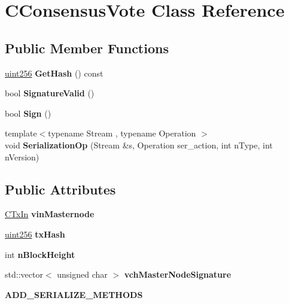 \hypertarget{class_c_consensus_vote}{}\section{C\+Consensus\+Vote Class Reference}
\label{class_c_consensus_vote}
\subsection*{Public Member Functions}
\begin{DoxyCompactItemize}
\item 
\mbox{\label{class_c_consensus_vote_a1bf097f2b12e5a77969bc489a6508399}} 
\mbox{\hyperlink{classuint256}{uint256}} {\bfseries Get\+Hash} () const
\item 
\mbox{\label{class_c_consensus_vote_ac6550a89acee255e0035e189a42a6310}} 
bool {\bfseries Signature\+Valid} ()
\item 
\mbox{\label{class_c_consensus_vote_a687495887aa75f5d5bb70f93ecb820d0}} 
bool {\bfseries Sign} ()
\item 
\mbox{\label{class_c_consensus_vote_a103f72505be81d78565e52331b6c563b}} 
{\footnotesize template$<$typename Stream , typename Operation $>$ }\\void {\bfseries Serialization\+Op} (Stream \&s, Operation ser\+\_\+action, int n\+Type, int n\+Version)
\end{DoxyCompactItemize}
\subsection*{Public Attributes}
\begin{DoxyCompactItemize}
\item 
\mbox{\label{class_c_consensus_vote_a6000745a7e84310ca5e05028541cff8d}} 
\mbox{\hyperlink{class_c_tx_in}{C\+Tx\+In}} {\bfseries vin\+Masternode}
\item 
\mbox{\label{class_c_consensus_vote_a3eca3f8fac54643f7f2ac863635491d6}} 
\mbox{\hyperlink{classuint256}{uint256}} {\bfseries tx\+Hash}
\item 
\mbox{\label{class_c_consensus_vote_a19f39b69e4adf3f9b5557d465cabc7ed}} 
int {\bfseries n\+Block\+Height}
\item 
\mbox{\label{class_c_consensus_vote_acde668b6ad82a6df4860e5489a8997c9}} 
std\+::vector$<$ unsigned char $>$ {\bfseries vch\+Master\+Node\+Signature}
\item 
\mbox{\label{class_c_consensus_vote_af0f1e45072c8cf14e8e00eb28a505835}} 
{\bfseries A\+D\+D\+\_\+\+S\+E\+R\+I\+A\+L\+I\+Z\+E\+\_\+\+M\+E\+T\+H\+O\+DS}
\end{DoxyCompactItemize}


